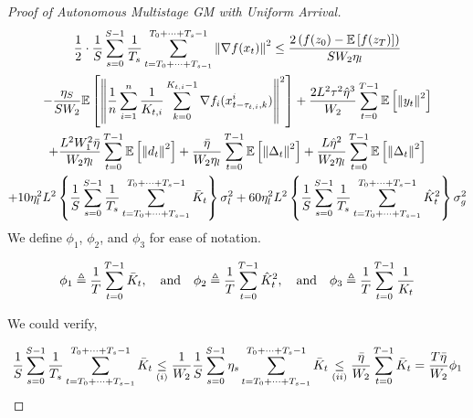 \begin{proof}[Proof of Autonomous Multistage GM with Uniform Arrival]
\begin{equation}
\begin{gathered}
\frac{1}{2} \cdot \frac{1}{S}\sum_{s=0}^{S-1} \frac{1}{T_s}\sum_{t=T_0+\dots+T_{s-1} }^{T_0+\dots+T_s-1} \left\|\nabla f(x_t)\right\|^2
\leq \frac{2\left(f(z_0) - \mathbb{E}\left[f(z_{T})\right]  \right)}{S W_2 \eta_l} \\
- \frac{\eta_S}{S W_2} \mathbb{E}\left[\left\| \frac{1}{n}\sum_{i=1}^n \frac{1}{K_{t,i}} \sum_{k=0}^{K_{t,i}-1} \nabla f_i(x_{t-\tau_{t,i},k}^i) \right\|^2\right]
+  \frac{2 L^2 \tau^2 \hat{\eta}^3}{W_2} \sum_{t=0}^{T-1}\mathbb{E}\left[\left\|  y_t \right\|^2\right] \\
+ \frac{L^2 W_1^2 \Bar{\eta}}{ W_2 \eta_l} \sum_{t=0}^{T-1}\mathbb{E}\left[\left\| d_t\right\|^2\right] + \frac{\Bar{\eta}}{ W_2 \eta_l} \sum_{t=0}^{T-1} \mathbb{E}\left[\left\|\Delta_t\right\|^2\right]  + \frac{L \hat{\eta}^2}{W_2 \eta_l} \sum_{t=0}^{T-1} \mathbb{E}\left[\left\| \Delta_t\right\|^2\right]\\
+ 10  \eta^2_l L^2 \left\{\frac{1}{S}\sum_{s=0}^{S-1} \frac{1}{T_s}\sum_{t=T_0+\dots+T_{s-1} }^{T_0+\dots+T_s-1} \Bar{K}_t\right\} \sigma_l^2 + 60 \eta^2_l L^2 \left\{\frac{1}{S}\sum_{s=0}^{S-1} \frac{1}{T_s}\sum_{t=T_0+\dots+T_{s-1} }^{T_0+\dots+T_s-1} \hat{K}_t^2 \right\} \sigma_g^2
\end{gathered}\nonumber
\end{equation}
We define $\phi_1$, $\phi_2$, and $\phi_3$ for ease of notation.

\begin{equation}
\begin{gathered}
\phi_1 \triangleq  \frac{1}{T}\sum_{t=0}^{T-1} \Bar{K}_t,  \quad \text{and} \quad  \phi_2 \triangleq  \frac{1}{T}\sum_{t=0}^{T-1} \hat{K}_t^2 ,  \quad \text{and} \quad 
\phi_3 \triangleq \frac{1}{T}\sum_{t=0}^{T-1} \frac{1}{K_t}
\end{gathered}\nonumber
\end{equation}

We could verify,

\begin{equation}
\begin{gathered}
\frac{1}{S}\sum_{s=0}^{S-1} \frac{1}{T_s}\sum_{t=T_0+\dots+T_{s-1} }^{T_0+\dots+T_s-1} \Bar{K}_t \underset{(i)}{\leq} \frac{1}{W_2} \frac{1}{S}\sum_{s=0}^{S-1} \eta_s \sum_{t=T_0+\dots+T_{s-1} }^{T_0+\dots+T_s-1} \Bar{K}_t \underset{(ii)}{\leq} \frac{\Bar{\eta}}{W_2} \sum_{t=0}^{T-1}\Bar{K}_t = \frac{T \Bar{\eta}}{W_2} \phi_1
\end{gathered}\nonumber
\end{equation}


\end{proof}
